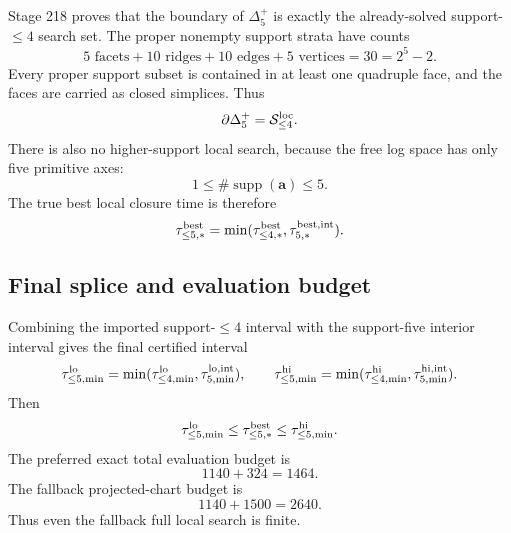 Stage 218 proves that the boundary of \(\Delta_5^+\) is exactly the already-solved support-\(\le4\) search set.  The proper nonempty support strata have counts
\begin{equation}
\label{eq:app-part06-boundary-strata-counts}
5\text{ facets}+10\text{ ridges}+10\text{ edges}+5\text{ vertices}=30=2^5-2.
\end{equation}
Every proper support subset is contained in at least one quadruple face, and the faces are carried as closed simplices.  Thus
\begin{equation}
\label{eq:app-part06-boundary-identification}
\partial\Delta_5^+=\mathcal S_{\le4}^{\rm loc}.
\end{equation}
There is also no higher-support local search, because the free log space has only five primitive axes:
\begin{equation}
\label{eq:app-part06-support-ceiling}
1\le \#\operatorname{supp}(\mathbf a)\le5.
\end{equation}
The true best local closure time is therefore
\begin{equation}
\label{eq:app-part06-best-le5-true}
\tau_{\le5,*}^{\rm best}
=
\min(\tau_{\le4,*}^{\rm best},\tau_{5,*}^{\rm best,int}).
\end{equation}

\subsection{Final splice and evaluation budget}
\label{subsec:app-part06-final-splice-evaluation-budget}

Combining the imported support-\(\le4\) interval with the support-five interior interval gives the final certified interval
\begin{equation}
\label{eq:app-part06-final-splice}
\tau_{\le5,\min}^{\rm lo}
=
\min(\tau_{\le4,\min}^{\rm lo},\tau_{5,\min}^{\rm lo,int}),
\qquad
\tau_{\le5,\min}^{\rm hi}
=
\min(\tau_{\le4,\min}^{\rm hi},\tau_{5,\min}^{\rm hi,int}).
\end{equation}
Then
\begin{equation}
\label{eq:app-part06-final-splice-bound}
\tau_{\le5,\min}^{\rm lo}
\le
\tau_{\le5,*}^{\rm best}
\le
\tau_{\le5,\min}^{\rm hi}.
\end{equation}
The preferred exact total evaluation budget is
\begin{equation}
\label{eq:app-part06-final-budget}
1140+324=1464.
\end{equation}
The fallback projected-chart budget is
\begin{equation}
\label{eq:app-part06-fallback-budget}
1140+1500=2640.
\end{equation}
Thus even the fallback full local search is finite.

